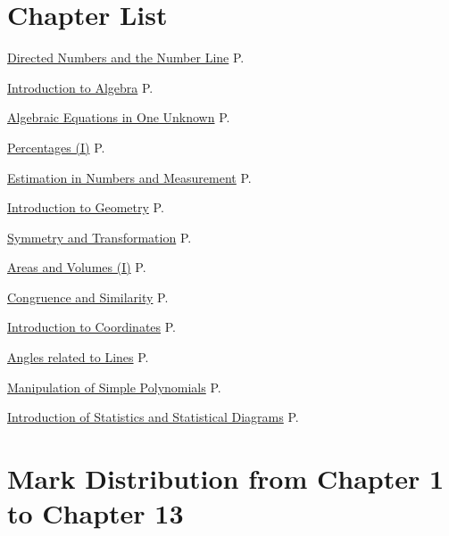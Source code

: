 \documentclass[12pt, a4paper]{article}
\begin{document}
\section*{Chapter List}
\begin{enumx}[label=Ch \arabic*. , leftmargin=2cm,rightmargin=0pt,labelwidth=17mm, itemsep=3pt, topsep=3mm, labelsep=2mm, labelindent=0pt, align=left, partopsep=0mm ]
\item \hyperref[chapter:S1-1]{Directed Numbers and the Number Line} \hfill P.\pageref{chapter:S1-1}
\item \hyperref[chapter:S1-2]{Introduction to Algebra} \hfill P.\pageref{chapter:S1-2}
\item \hyperref[chapter:S1-3]{Algebraic Equations in One Unknown} \hfill P.\pageref{chapter:S1-3}
\item \hyperref[chapter:S1-4]{Percentages (I)} \hfill P.\pageref{chapter:S1-4}
\item \hyperref[chapter:S1-5]{Estimation in Numbers and Measurement} \hfill P.\pageref{chapter:S1-5}
\item \hyperref[chapter:S1-6]{Introduction to Geometry} \hfill P.\pageref{chapter:S1-6}
\item \hyperref[chapter:S1-7]{Symmetry and Transformation} \hfill P.\pageref{chapter:S1-7}
\item \hyperref[chapter:S1-8]{Areas and Volumes (I)} \hfill P.\pageref{chapter:S1-8}
\item \hyperref[chapter:S1-9]{Congruence and Similarity} \hfill P.\pageref{chapter:S1-9}
\item \hyperref[chapter:S1-10]{Introduction to Coordinates} \hfill P.\pageref{chapter:S1-10}
\item \hyperref[chapter:S1-11]{Angles related to Lines} \hfill P.\pageref{chapter:S1-11}
\item \hyperref[chapter:S1-12]{Manipulation of Simple Polynomials} \hfill P.\pageref{chapter:S1-12}
\item \hyperref[chapter:S1-13]{Introduction of Statistics and Statistical Diagrams} \hfill P.\pageref{chapter:S1-13}
\end{enumx}
\section*{Mark Distribution from Chapter 1 to Chapter 13}
\begin{center}
\end{center}
\end{document}
